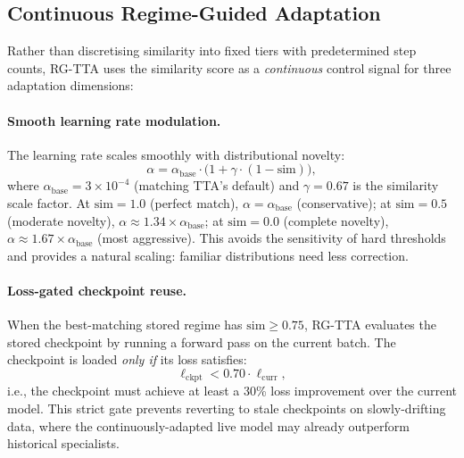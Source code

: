 \documentclass[journal]{IEEEtran}
\begin{document}
\subsection{Continuous Regime-Guided Adaptation}
\label{sec:adaptation}

Rather than discretising similarity into fixed tiers with predetermined step counts, RG-TTA uses the similarity score as a \emph{continuous} control signal for three adaptation dimensions:

\paragraph{Smooth learning rate modulation.} The learning rate scales smoothly with distributional novelty:
\begin{equation}
  \alpha = \alpha_{\text{base}} \cdot \big(1 + \gamma \cdot (1 - \text{sim})\big),
  \label{eq:lr}
\end{equation}
where $\alpha_{\text{base}} = 3 \times 10^{-4}$ (matching TTA's default) and $\gamma = 0.67$ is the similarity scale factor. At $\text{sim} = 1.0$ (perfect match), $\alpha = \alpha_{\text{base}}$ (conservative); at $\text{sim} = 0.5$ (moderate novelty), $\alpha \approx 1.34 \times \alpha_{\text{base}}$; at $\text{sim} = 0.0$ (complete novelty), $\alpha \approx 1.67 \times \alpha_{\text{base}}$ (most aggressive). This avoids the sensitivity of hard thresholds and provides a natural scaling: familiar distributions need less correction.

\paragraph{Loss-gated checkpoint reuse.} When the best-matching stored regime has $\text{sim} \geq 0.75$, RG-TTA evaluates the stored checkpoint by running a forward pass on the current batch. The checkpoint is loaded \emph{only if} its loss satisfies:
\begin{equation}
  \ell_{\text{ckpt}} < 0.70 \cdot \ell_{\text{curr}},
  \label{eq:gate}
\end{equation}
i.e., the checkpoint must achieve at least a 30\% loss improvement over the current model. This strict gate prevents reverting to stale checkpoints on slowly-drifting data, where the continuously-adapted live model may already outperform historical specialists.
\end{document}
